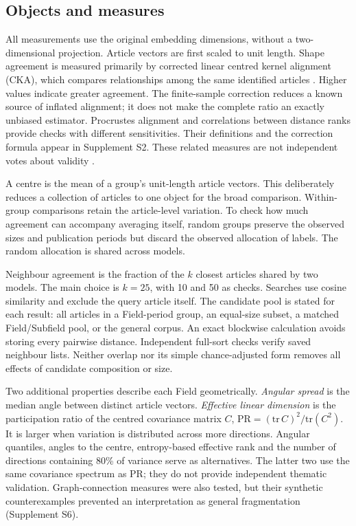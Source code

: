 \documentclass[12pt]{article}
\begin{document}
\subsection{Objects and measures}
All measurements use the original embedding dimensions, without a two-dimensional projection. Article vectors are first scaled to unit length. Shape agreement is measured primarily by corrected linear centred kernel alignment (CKA), which compares relationships among the same identified articles \citep{pmlr-v97-kornblith19a,refa961d84a4e}. Higher values indicate greater agreement. The finite-sample correction reduces a known source of inflated alignment; it does not make the complete ratio an exactly unbiased estimator. Procrustes alignment and correlations between distance ranks provide checks with different sensitivities. Their definitions and the correction formula appear in Supplement S2. These related measures are not independent votes about validity \citep{NEURIPS2021_252a3dba,pmlr-v285-williams24a}.

A centre is the mean of a group's unit-length article vectors. This deliberately reduces a collection of articles to one object for the broad comparison. Within-group comparisons retain the article-level variation. To check how much agreement can accompany averaging itself, random groups preserve the observed sizes and publication periods but discard the observed allocation of labels. The random allocation is shared across models.

Neighbour agreement is the fraction of the $k$ closest articles shared by two models. The main choice is $k=25$, with 10 and 50 as checks. Searches use cosine similarity and exclude the query article itself. The candidate pool is stated for each result: all articles in a Field-period group, an equal-size subset, a matched Field/Subfield pool, or the general corpus. An exact blockwise calculation avoids storing every pairwise distance. Independent full-sort checks verify saved neighbour lists. Neither overlap nor its simple chance-adjusted form removes all effects of candidate composition or size.

Two additional properties describe each Field geometrically. \emph{Angular spread} is the median angle between distinct article vectors. \emph{Effective linear dimension} is the participation ratio of the centred covariance matrix $C$, $\mathrm{PR}=(\mathrm{tr}\,C)^2/\mathrm{tr}(C^2)$. It is larger when variation is distributed across more directions. Angular quantiles, angles to the centre, entropy-based effective rank and the number of directions containing 80\% of variance serve as alternatives. The latter two use the same covariance spectrum as PR; they do not provide independent thematic validation. Graph-connection measures were also tested, but their synthetic counterexamples prevented an interpretation as general fragmentation (Supplement S6).
\end{document}
